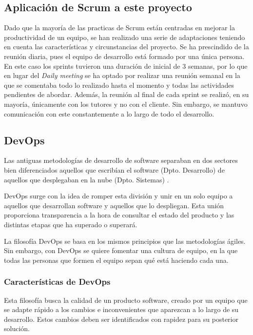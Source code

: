 \subsection{Aplicación de Scrum a este proyecto}
Dado que la mayoría de las practicas de Scrum están centradas en mejorar la productividad de un equipo, se han realizado una serie de adaptaciones teniendo en cuenta las características y circunstancias del proyecto. Se ha prescindido de la reunión diaria, pues el equipo de desarrollo está formado por una única persona. En este caso los sprints tuvieron una duración de inicial de 3 semanas, por lo que en lugar del \textit{Daily meeting} se ha optado por realizar una reunión semanal en la que se comentaba todo lo realizado hasta el momento y todas las actividades pendientes de abordar. Además, la reunión al final de cada sprint se realizó, en su mayoría, únicamente con los tutores y no con el cliente. Sin embargo, se mantuvo comunicación con este constantemente a lo largo de todo el desarrollo.

\subsection{DevOps}

Las antiguas metodologías de desarrollo de software separaban en dos sectores bien diferenciados aquellos que escribían el software (Dpto. Desarrollo) de aquellos que desplegaban en la nube (Dpto. Sistemas) \cite{devops5}.

DevOps surge con la idea de romper esta división y unir en un solo equipo a aquellos que desarrollan software y aquellos que lo despliegan. Esta unión proporciona transparencia a la hora de consultar el estado del producto y las distintas etapas que ha superado o superará.

La filosofía DevOps se basa en los mismos principios que las metodologías ágiles. Sin embargo, con DevOps se quiere fomentar una cultura de equipo, en la que todas las personas que formen el equipo sepan qué está haciendo cada una.

\subsubsection{Características de DevOps}
Esta filosofía busca la calidad de un producto software, creado por un equipo que se adapte rápido a los cambios e inconvenientes que aparezcan a lo largo de su desarrollo. Estos cambios deben ser identificados con rapidez para su posterior solución.

